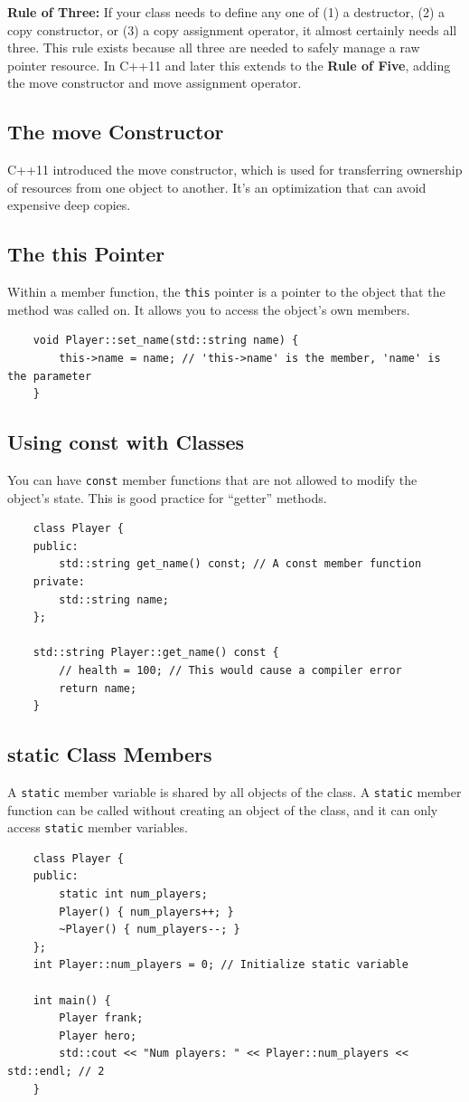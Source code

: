 \begin{remark}
	\textbf{Rule of Three:} If your class needs to define any one of (1) a destructor, (2) a copy constructor, or (3) a copy assignment operator, it almost certainly needs all three. This rule exists because all three are needed to safely manage a raw pointer resource. In C++11 and later this extends to the \textbf{Rule of Five}, adding the move constructor and move assignment operator.
\end{remark}

\subsection{The move Constructor}
C++11 introduced the move constructor, which is used for transferring ownership of resources from one object to another. It's an optimization that can avoid expensive deep copies.

\subsection{The this Pointer}
Within a member function, the \texttt{this} pointer is a pointer to the object that the method was called on. It allows you to access the object's own members.
\begin{lstlisting}
	void Player::set_name(std::string name) {
		this->name = name; // 'this->name' is the member, 'name' is the parameter
	}
\end{lstlisting}

\subsection{Using const with Classes}
You can have \texttt{const} member functions that are not allowed to modify the object's state. This is good practice for ``getter'' methods.
\begin{lstlisting}
	class Player {
	public:
		std::string get_name() const; // A const member function
	private:
		std::string name;
	};

	std::string Player::get_name() const {
		// health = 100; // This would cause a compiler error
		return name;
	}
\end{lstlisting}

\subsection{static Class Members}
A \texttt{static} member variable is shared by all objects of the class. A \texttt{static} member function can be called without creating an object of the class, and it can only access \texttt{static} member variables.
\begin{lstlisting}
	class Player {
	public:
		static int num_players;
		Player() { num_players++; }
		~Player() { num_players--; }
	};
	int Player::num_players = 0; // Initialize static variable

	int main() {
		Player frank;
		Player hero;
		std::cout << "Num players: " << Player::num_players << std::endl; // 2
	}
\end{lstlisting}

